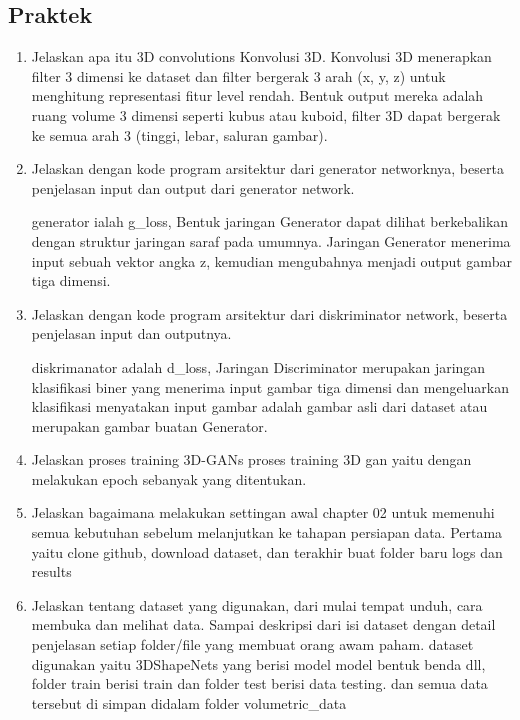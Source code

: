         \subsection{Praktek}
        \begin{enumerate}
        \item Jelaskan apa itu 3D convolutions
        Konvolusi 3D. Konvolusi 3D menerapkan filter 3 dimensi ke dataset dan filter bergerak 3 arah (x, y, z) untuk menghitung representasi fitur level rendah. Bentuk output mereka adalah ruang volume 3 dimensi seperti kubus atau kuboid, filter 3D dapat bergerak ke semua arah 3 (tinggi, lebar, saluran gambar).
        
        \item Jelaskan dengan kode program arsitektur dari generator networknya, beserta penjelasan input dan output dari generator network.
        
        generator ialah g\_loss, Bentuk jaringan Generator dapat dilihat berkebalikan dengan struktur jaringan saraf pada umumnya. Jaringan Generator menerima input sebuah vektor angka z, kemudian mengubahnya menjadi output gambar tiga dimensi.
        
        \item Jelaskan dengan kode program arsitektur dari diskriminator network, beserta penjelasan input dan outputnya.
        
        diskrimanator adalah d\_loss, Jaringan Discriminator merupakan jaringan klasifikasi biner yang menerima input gambar tiga dimensi dan mengeluarkan klasifikasi menyatakan input gambar adalah gambar asli dari dataset atau merupakan gambar buatan Generator.
        
        \item Jelaskan proses training 3D-GANs
        proses training 3D gan yaitu dengan melakukan epoch sebanyak yang ditentukan.
        
        \item Jelaskan bagaimana melakukan settingan awal chapter 02 untuk memenuhi semua kebutuhan sebelum melanjutkan ke tahapan persiapan data. Pertama yaitu clone github, download dataset, dan terakhir buat folder baru logs dan results
        
        \item Jelaskan tentang dataset yang digunakan, dari mulai tempat unduh, cara membuka dan melihat data. Sampai deskripsi dari isi dataset dengan detail penjelasan setiap folder/file yang membuat orang awam paham.
        dataset digunakan yaitu 3DShapeNets yang berisi model model bentuk benda dll, folder train berisi train dan folder test berisi data testing. dan semua data tersebut di simpan didalam folder volumetric\_data 
        

\end{enumerate}
